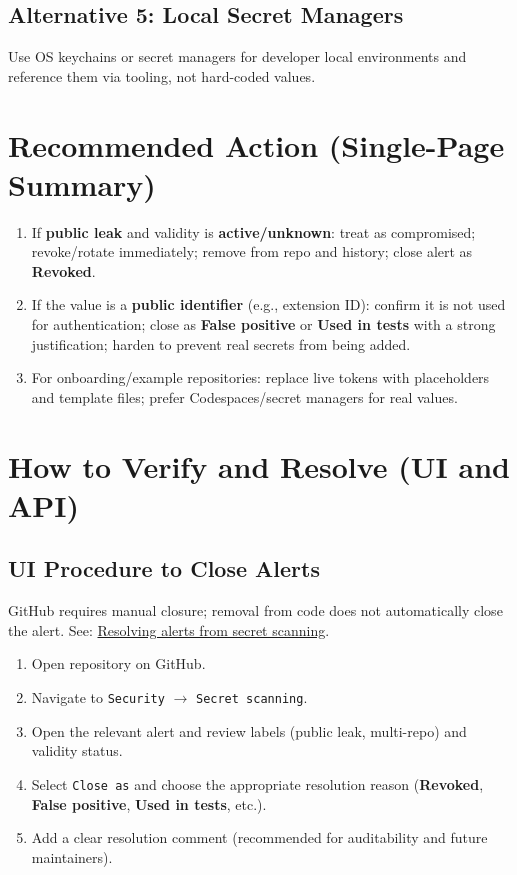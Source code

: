 \documentclass[11pt]{article}
\providecommand{\term}[1]{\textbf{#1}}
\newcommand{\codeinline}[1]{\texttt{#1}}
\begin{document}
\subsection{Alternative 5: Local Secret Managers}
Use OS keychains or secret managers for developer local environments and reference them via tooling, not hard-coded values.

\section{Recommended Action (Single-Page Summary)}
\begin{tcolorbox}[colback=LightGray,colframe=Gray,title=Recommended Action Summary]
\begin{enumerate}
  \item If \textbf{public leak} and validity is \textbf{active/unknown}: treat as compromised; revoke/rotate immediately; remove from repo and history; close alert as \textbf{Revoked}.
  \item If the value is a \textbf{public identifier} (e.g., extension ID): confirm it is not used for authentication; close as \textbf{False positive} or \textbf{Used in tests} with a strong justification; harden to prevent real secrets from being added.
  \item For onboarding/example repositories: replace live tokens with placeholders and template files; prefer Codespaces/secret managers for real values.
\end{enumerate}
\end{tcolorbox}

\section{How to Verify and Resolve (UI and API)}
\subsection{UI Procedure to Close Alerts}
GitHub requires manual closure; removal from code does not automatically close the alert. See: \href{https://docs.github.com/code-security/secret-scanning/managing-alerts-from-secret-scanning/resolving-alerts}{Resolving alerts from secret scanning}.
\begin{enumerate}
  \item Open repository on GitHub.
  \item Navigate to \codeinline{Security} $\rightarrow$ \codeinline{Secret scanning}.
  \item Open the relevant alert and review labels (public leak, multi-repo) and validity status.
  \item Select \codeinline{Close as} and choose the appropriate resolution reason (\term{Revoked}, \term{False positive}, \term{Used in tests}, etc.).
  \item Add a clear resolution comment (recommended for auditability and future maintainers).
\end{enumerate}
\end{document}
